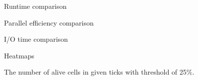 \documentclass[letter,12pt,english]{article}
\newlength\figureheight
\newlength\figurewidth
\begin{document}
\begin{figure}
\centering

\caption{Runtime comparison}
\label{fig:runtime-comparison}
\end{figure}

\begin{figure}
\centering

\caption{Parallel efficiency comparison}
\label{fig:efficiency-comparison}
\end{figure}

\begin{figure}
\centering

\caption{I/O time comparison}
\label{fig:io-comparison}
\end{figure}

\begin{figure}
    \centering
    \setlength\figureheight{\textwidth}
    \setlength\figurewidth{\textwidth}
    
    \caption{Heatmaps}
    \label{fig:heatmap}
\end{figure}

\begin{figure}
\centering
\setlength\figureheight{5in}
\setlength\figurewidth{6in}

\caption{The number of alive cells in given ticks with threshold of 25\%.}
\label{fig:alive-cells}
\end{figure}
\end{document}
